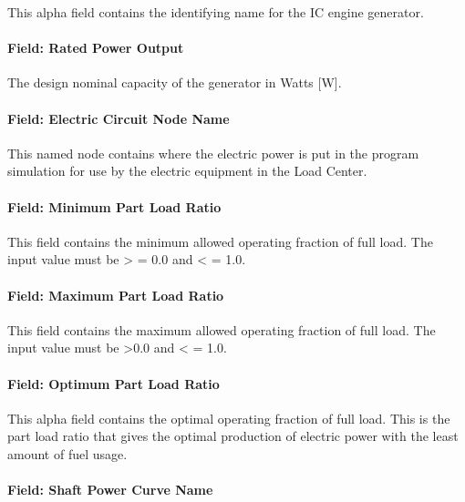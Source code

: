 This alpha field contains the identifying name for the IC engine generator.

\paragraph{Field: Rated Power Output}\label{field-rated-power-output}

The design nominal capacity of the generator in Watts {[}W{]}.

\paragraph{Field: Electric Circuit Node Name}\label{field-electric-circuit-node-name}

This named node contains where the electric power is put in the program simulation for use by the electric equipment in the Load Center.

\paragraph{Field: Minimum Part Load Ratio}\label{field-minimum-part-load-ratio}

This field contains the minimum allowed operating fraction of full load. The input value must be \textgreater{} = 0.0 and \textless{} = 1.0.

\paragraph{Field: Maximum Part Load Ratio}\label{field-maximum-part-load-ratio}

This field contains the maximum allowed operating fraction of full load. The input value must be \textgreater{}0.0 and \textless{} = 1.0.

\paragraph{Field: Optimum Part Load Ratio}\label{field-optimum-part-load-ratio}

This alpha field contains the optimal operating fraction of full load. This is the part load ratio that gives the optimal production of electric power with the least amount of fuel usage.

\paragraph{Field: Shaft Power Curve Name}\label{field-shaft-power-curve-name}

